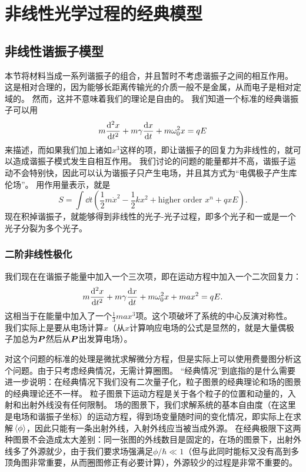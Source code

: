 \section{非线性光学过程的经典模型}\label{sec:classical-models}

\subsection{非线性谐振子模型}\label{sec:classical-oscillator}

本节将材料当成一系列谐振子的组合，并且暂时不考虑谐振子之间的相互作用。
这是相对合理的，因为能够长距离传输光的介质一般不是金属，从而电子是相对定域的。
然而，这并不意味着我们的理论是自由的。
我们知道一个标准的经典谐振子可以用
\begin{equation}
    m \dv[2]{x}{t} + m \gamma \dv{x}{t} + m \omega_0^2 x = q E
\end{equation}
来描述，而如果我们加上诸如$x^3$这样的项，即让谐振子的回复力为非线性的，就可以造成谐振子模式发生自相互作用。
我们讨论的问题的能量都并不高，谐振子运动不会特别快，因此可以认为谐振子只产生电场，并且其方式为“电偶极子产生库伦场”。
用作用量表示，就是%
\[
    S = \int \dd{t} \left( \frac{1}{2} m \dot{x}^2 - \frac{1}{2} k x^2 + \text{higher order $x^n$} + qxE \right).
\]
现在积掉谐振子，就能够得到非线性的光子-光子过程，即多个光子和一或是一个光子分裂为多个光子。

\subsubsection{二阶非线性极化}

我们现在在谐振子能量中加入一个三次项，即在运动方程中加入一个二次回复力：
\begin{equation}
    m \dv[2]{x}{t} + m \gamma \dv{x}{t} + m \omega_0^2 x + m a x^2 = q E.
    \label{eq:x3-eq}
\end{equation}
这相当于在能量中加入了一个$\frac{1}{3} m a x^3$项。这个项破坏了系统的中心反演对称性。
我们实际上是要从电场计算$x$（从$x$计算响应电场的公式是显然的，就是大量偶极子加总为$\vb*{P}$然后从$\vb*{P}$出发算电场）。

对这个问题的标准的处理是微扰求解微分方程，但是实际上可以使用费曼图分析这个问题。由于只考虑经典情况，无需计算圈图。
“经典情况”到底指的是什么需要进一步说明：在经典情况下我们没有二次量子化，粒子图景的经典理论和场的图景的经典理论还不一样。
粒子图景下运动方程是关于各个粒子的位置和动量的，入射和出射外线没有任何限制。
场的图景下，我们求解系统的基本自由度（在这里是电场和谐振子坐标）的运动方程，得到场变量随时间的变化情况，即实际上在求解$\expval*{\phi}$，因此只能有一条出射外线，入射外线应当被当成外源。
在经典极限下这两种图景不会造成太大差别：同一张图的外线数目是固定的，在场的图景下，出射外线多了外源就少，由于我们要求场强满足$\phi / \hbar \ll 1$（但与此同时能标又没有高到多顶角图非常重要，从而圈图修正有必要计算），外源较少的过程是非常不重要的。

